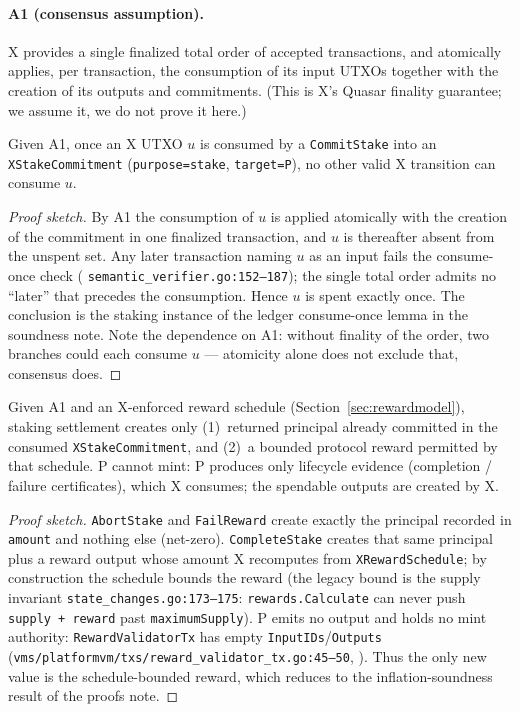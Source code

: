 \paragraph{A1 (consensus assumption).} X provides a single finalized
total order of accepted transactions, and atomically applies, per
transaction, the consumption of its input UTXOs together with the
creation of its outputs and commitments. (This is X's Quasar finality
guarantee; we assume it, we do not prove it here.)

\begin{theorem}
\label{thm:nodouble}
Given A1, once an X UTXO $u$ is consumed by a \texttt{CommitStake} into an
\texttt{XStakeCommitment} (\texttt{purpose=stake}, \texttt{target=P}), no
other valid X transition can consume $u$.
\end{theorem}
\begin{proof}[Proof sketch]
By A1 the consumption of $u$ is applied atomically with the creation of
the commitment in one finalized transaction, and $u$ is thereafter
absent from the unspent set. Any later transaction naming $u$ as an input
fails the consume-once check (\IMPL{}
\texttt{semantic\_verifier.go:152--187}); the single total order admits no
``later'' that precedes the consumption. Hence $u$ is spent exactly once.
The conclusion is the staking instance of the ledger consume-once lemma
in the soundness note. Note the dependence on A1: without finality of the
order, two branches could each consume $u$ --- atomicity alone does not
exclude that, consensus does.
\end{proof}

\begin{theorem}
\label{thm:noinfl}
Given A1 and an X-enforced reward schedule
(Section~\ref{sec:rewardmodel}), staking settlement creates only
(1)~returned principal already committed in the consumed
\texttt{XStakeCommitment}, and (2)~a bounded protocol reward permitted by
that schedule. P cannot mint: P produces only lifecycle evidence
(completion / failure certificates), which X consumes; the spendable
outputs are created by X.
\end{theorem}
\begin{proof}[Proof sketch]
\texttt{AbortStake} and \texttt{FailReward} create exactly the principal
recorded in \texttt{amount} and nothing else (net-zero). \texttt{CompleteStake}
creates that same principal plus a reward output whose amount X recomputes
from \texttt{XRewardSchedule}; by construction the schedule bounds the
reward (the legacy bound is the supply invariant
\texttt{state\_changes.go:173--175}: \texttt{rewards.Calculate} can never
push \texttt{supply + reward} past \texttt{maximumSupply}). P emits no
output and holds no mint authority: \texttt{RewardValidatorTx} has empty
\texttt{InputIDs}/\texttt{Outputs}
(\texttt{vms/platformvm/txs/reward\_validator\_tx.go:45--50}, \IMPL{}). Thus the
only new value is the schedule-bounded reward, which reduces to the
inflation-soundness result of the proofs note.
\end{proof}

